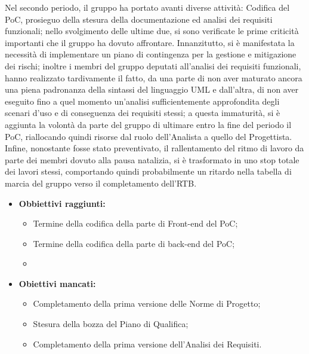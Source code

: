 Nel secondo periodo, il gruppo ha portato avanti diverse attività: Codifica del PoC, prosieguo della stesura della documentazione ed analisi dei requisiti funzionali; nello svolgimento delle ultime due, si sono verificate
le prime criticità importanti che il gruppo ha dovuto affrontare. Innanzitutto, si è manifestata la necessità di implementare un piano di contingenza per la gestione e mitigazione dei rischi; inoltre i membri del gruppo deputati
all'analisi dei requisiti funzionali, hanno realizzato tardivamente il fatto, da una parte di non aver maturato ancora una piena padronanza della sintassi del linguaggio UML e dall'altra, di non aver eseguito fino a quel
momento un'analisi sufficientemente approfondita degli scenari d'uso e di conseguenza dei requisiti stessi; a questa immaturità, si è aggiunta la volontà da parte del gruppo di ultimare
entro la fine del periodo il PoC, riallocando quindi risorse dal ruolo dell'Analista a quello del Progettista. \\
Infine, nonostante fosse stato preventivato, il rallentamento del ritmo di lavoro da parte dei membri
dovuto alla pausa natalizia, si è trasformato in uno stop totale dei lavori stessi, comportando quindi probabilmente un ritardo nella tabella di marcia del gruppo verso il completamento dell'RTB.
\begin{itemize}
\item \textbf{Obbiettivi raggiunti:}
    \begin{itemize}
        \item Termine della codifica della parte di Front-end del PoC;
        \item Termine della codifica della parte di back-end del PoC;
        \item
    \end{itemize}
    \item \textbf{Obiettivi mancati:}
    \begin{itemize}
        \item Completamento della prima versione delle Norme di Progetto;
        \item Stesura della bozza del Piano di Qualifica;
        \item Completamento della prima versione dell'Analisi dei Requisiti.
    \end{itemize}
\end{itemize}